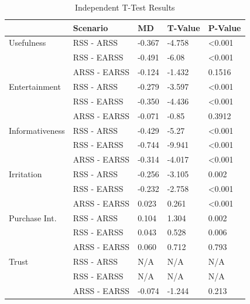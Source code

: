 \documentclass[letterpaper, 10 pt, conference]{ieeeconf}
\begin{document}
\begin{table}[h!]
\begin{tabular}{|l|l|l|l|l|}
\hline
                & Scenario     & MD     & T-Value & P-Value          \\ \hline
Usefulness      & RSS - ARSS   & -0.367 & -4.758  & \textless{}0.001 \\ \hline
                & RSS - EARSS  & -0.491 & -6.08   & \textless{}0.001 \\ \hline
                & ARSS - EARSS & -0.124 & -1.432  & 0.1516           \\ \hline
Entertainment   & RSS - ARSS   & -0.279 & -3.597  & \textless{}0.001 \\ \hline
                & RSS - EARSS  & -0.350 & -4.436  & \textless{}0.001 \\ \hline
                & ARSS - EARSS & -0.071 & -0.85   & 0.3912           \\ \hline
Informativeness & RSS - ARSS   & -0.429 & -5.27   & \textless{}0.001 \\ \hline
                & RSS - EARSS  & -0.744 & -9.941  & \textless{}0.001 \\ \hline
                & ARSS - EARSS & -0.314 & -4.017  & \textless{}0.001 \\ \hline
Irritation      & RSS - ARSS   & -0.256 & -3.105  & 0.002            \\ \hline
                & RSS - EARSS  & -0.232 & -2.758  & \textless{}0.001 \\ \hline
                & ARSS - EARSS & 0.023  & 0.261   & \textless{}0.001 \\ \hline
Purchase Int.   & RSS - ARSS   & 0.104  & 1.304   & 0.002            \\ \hline
                & RSS - EARSS  & 0.043  & 0.528   & 0.006            \\ \hline
                & ARSS - EARSS & 0.060  & 0.712   & 0.793            \\ \hline
Trust           & RSS - ARSS   & N/A    & N/A     & N/A              \\ \hline
                & RSS - EARSS  & N/A    & N/A     & N/A              \\ \hline
                & ARSS - EARSS & -0.074 & -1.244  & 0.213            \\ \hline
\end{tabular}
\caption{\label{table}Independent T-Test Results}
\end{table}
\end{document}
